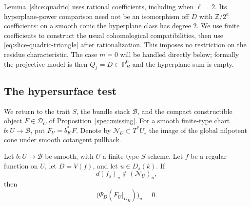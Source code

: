 \begin{remark}\label{rem:slice-rational-coefficients}
Lemma~\ref{slice:quadric} uses rational coefficients, including when
$\ell=2$.  Its hyperplane-power comparison need not be an isomorphism
off $D$ with $\mathbb Z/2^a$ coefficients: on a smooth conic the
hyperplane class has degree $2$.  We use finite coefficients to
construct the usual cohomological compatibilities, then use
\eqref{eq:slice-quadric-triangle} after rationalization.  This imposes
no restriction on the residue characteristic.  The case $m=0$ will
be handled directly below; formally the projective model is then
$Q_f=D\subset\mathbb P_B^0$ and the hyperplane sum is empty.
\end{remark}

\subsection{The hypersurface test}

We return to the trait $S$, the bundle stack $\mathcal B$, and the
compact constructible object $F\in\mathcal D_C$ of
Proposition~\ref{spec:missing}.  For a smooth finite-type chart
$b:U\to\mathcal B$, put $F_U=b_K^*F$.  Denote by
$\mathcal N_U\subset T^*U_s$ the image of the global nilpotent cone
under smooth cotangent pullback.

\begin{proposition}\label{slice:hypersurface}
Let $b:U\to\mathcal B$ be smooth, with $U$ a finite-type $S$-scheme.
Let $f$ be a regular function on $U$, let $D=V(f)$, and let
$u\in D_s(k)$.  If
\[
                 d(f_s)_u\notin(\mathcal N_U)_u,
\]
then
\[
                 \bigl(\Psi_D(F_U|_{D_K})\bigr)_u=0.
\]
\end{proposition}

